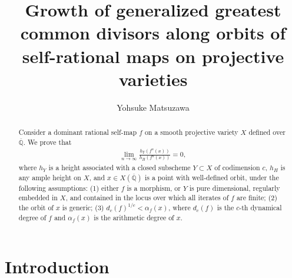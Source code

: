 \documentclass[12pt]{amsart}
\theoremstyle{plain}
\theoremstyle{definition}
\numberwithin{equation}{section}
\def\QQ{\overline{\mathbb Q}}
\begin{document}
	
	
	\title[Growth of generalized gcd]
	{Growth of generalized greatest common divisors along orbits of self-rational maps on projective varieties} 
	
	\author[Yohsuke Matsuzawa]{Yohsuke Matsuzawa}
	\address{Department of Mathematics, Graduate School of Science, Osaka Metropolitan University, 3-3-138, Sugimoto, Sumiyoshi, Osaka, 558-8585, Japan}
	
	
	\begin{abstract} 
		Consider a dominant rational self-map $f$ on a smooth projective variety $X$ defined over $\QQ$.
		We prove that 
		\begin{align}
		\lim_{n \to \infty} \frac{h_{Y}(f^{n}(x))}{h_{H}(f^{n}(x)) } = 0,
		\end{align}
		where $h_{Y}$ is a height 
		associated with a closed subscheme $Y \subset X$ of codimension $c$, $h_{H}$ is any ample height on $X$, and 
		$x \in X(\QQ)$ is a point with well-defined orbit, under the following assumptions:
		(1) either $f$ is a morphism, or $Y$ is pure dimensional, regularly embedded in $X$, and contained in 
		the locus over which all iterates of $f$ are finite;
		(2) the orbit of $x$ is generic;
		(3) $d_{c}(f)^{1/c} < \alpha_{f}(x)$,
		where $d_{c}(f)$ is the $c$-th dynamical degree of $f$ and $ \alpha_{f}(x)$ is the arithmetic degree of $x$.
	\end{abstract}
	
	
	
	
	
	
	\maketitle
	\tableofcontents
	
	
\section{Introduction}\label{sec:intro}
\end{document}
